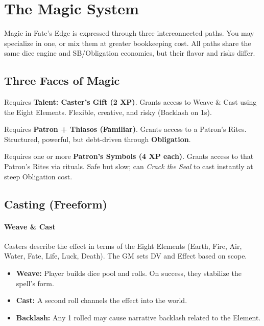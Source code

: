 

\section{The Magic System}

Magic in Fate's Edge is expressed through three interconnected paths. 
You may specialize in one, or mix them at greater bookkeeping cost. 
All paths share the same dice engine and SB/Obligation economies, but their flavor and risks differ.

\subsection{Three Faces of Magic}
\begin{description}[leftmargin=1.5em, style=nextline]
  \item[Caster (Freeform):] Requires \textbf{Talent: Caster’s Gift (2 XP)}. Grants access to Weave \& Cast using the Eight Elements. Flexible, creative, and risky (Backlash on 1s). 
  \item[Rites User (Runekeeper):] Requires \textbf{Patron + Thiasos (Familiar)}. Grants access to a Patron’s Rites. Structured, powerful, but debt-driven through \textbf{Obligation}.
  \item[Invoker (Symbol Path):] Requires one or more \textbf{Patron’s Symbols (4 XP each)}. Grants access to that Patron’s Rites via rituals. Safe but slow; can \emph{Crack the Seal} to cast instantly at steep Obligation cost.
\end{description}

\subsection{Casting (Freeform)}
\paragraph{Weave \& Cast}
Casters describe the effect in terms of the Eight Elements (Earth, Fire, Air, Water, Fate, Life, Luck, Death). The GM sets DV and Effect based on scope. 

\begin{itemize}
  \item \textbf{Weave:} Player builds dice pool and rolls. On success, they stabilize the spell’s form.
  \item \textbf{Cast:} A second roll channels the effect into the world. 
  \item \textbf{Backlash:} Any 1 rolled may cause narrative backlash related to the Element.
\end{itemize}

